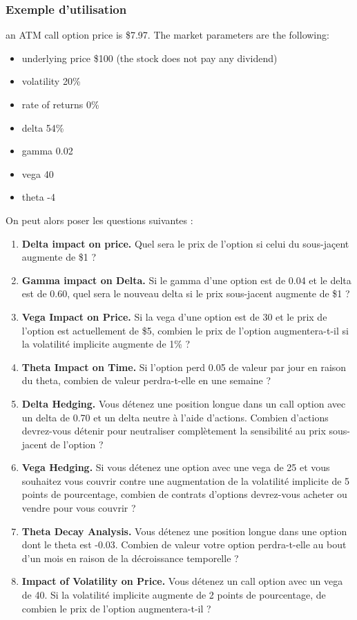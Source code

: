 \documentclass[a4paper]{article}
\begin{document}
\subsubsection{Exemple d'utilisation}
an ATM call option price is \$7.97. The market parameters are the following:
\begin{itemize}
    \item underlying price \$100 (the stock does not pay any dividend)
    \item volatility 20\%
    \item rate of returns 0\%
    \item delta 54\%
    \item gamma 0.02
    \item vega 40
    \item theta -4
\end{itemize}
On peut alors poser les questions suivantes :
\begin{enumerate}[label=\textit{Q\arabic*.}]
    \item \textbf{Delta impact on price.} Quel sera le prix de l'option si celui du sous-jaçent augmente de \$1 ?
    \item \textbf{Gamma impact on Delta.} Si le gamma d'une option est de 0.04 et le delta est de 0.60, quel sera le nouveau delta si le prix sous-jacent augmente de \$1 ?
    \item \textbf{Vega Impact on Price.} Si la vega d'une option est de 30 et le prix de l'option est actuellement de \$5, combien le prix de l'option augmentera-t-il si la volatilité implicite augmente de 1\% ?
    \item \textbf{Theta Impact on Time.} Si l'option perd 0.05 de valeur par jour en raison du theta, combien de valeur perdra-t-elle en une semaine ?
    \item \textbf{Delta Hedging.} Vous détenez une position longue dans un call option avec un delta de 0.70 et un delta neutre à l'aide d'actions. Combien d'actions devrez-vous détenir pour neutraliser complètement la sensibilité au prix sous-jacent de l'option ?
    \item \textbf{Vega Hedging.} Si vous détenez une option avec une vega de 25 et vous souhaitez vous couvrir contre une augmentation de la volatilité implicite de 5 points de pourcentage, combien de contrats d'options devrez-vous acheter ou vendre pour vous couvrir ?
    \item \textbf{Theta Decay Analysis.} Vous détenez une position longue dans une option dont le theta est -0.03. Combien de valeur votre option perdra-t-elle au bout d'un mois en raison de la décroissance temporelle ?
    \item \textbf{Impact of Volatility on Price.} Vous détenez un call option avec un vega de 40. Si la volatilité implicite augmente de 2 points de pourcentage, de combien le prix de l'option augmentera-t-il ?
\end{enumerate}
\end{document}
